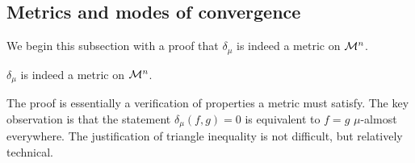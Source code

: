 \subsection{Metrics and modes of convergence}
We begin this subsection with a proof that $\delta_\mu$ is indeed a metric on ${\mathcal M}^n$.
\label{subsection:universality:measure:modes_of_convergence}
\begin{proposition}
\label{proposition:universality:measure:deltamumetric}
$\delta_\mu$ is indeed a metric on ${\mathcal M}^n$.
\end{proposition}
\begin{proof-idea*}
The proof is essentially a verification of properties a metric must satisfy. The key observation is that the statement $\delta_\mu(f, g) = 0$ is equivalent to $f = g$ $\mu$-almost everywhere. The justification of triangle inequality is not difficult, but relatively technical.
\end{proof-idea*}
